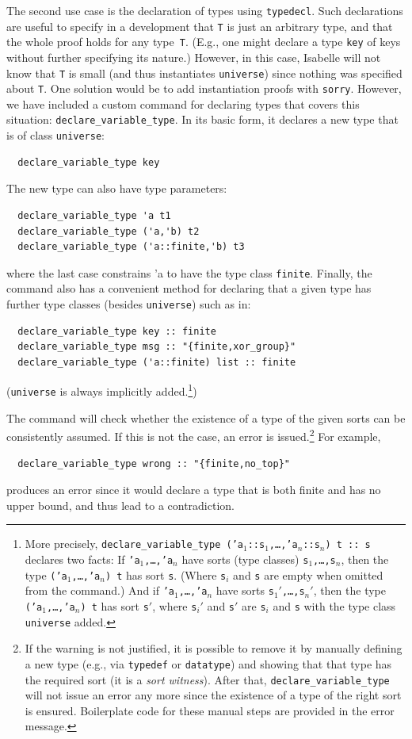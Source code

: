 \documentclass{article}
\begin{document}
The second use case is the declaration of types using
\texttt{typedecl}. Such declarations are useful to specify in a
development that \texttt{T} is just an arbitrary type, and that the
whole proof holds for any type~\texttt{T}. (E.g., one might declare a
type \texttt{key} of keys without further specifying its nature.)
However, in this case, Isabelle will not know that \texttt{T} is
small (and thus instantiates \texttt{universe}) since
nothing was specified about \texttt{T}. One solution would be to add
instantiation proofs with \texttt{sorry}. However, we have included a
custom command for declaring types that covers this situation:
\texttt{declare\_variable\_type}. In its basic form, it declares a new
type that is of class \texttt{universe}:
\begin{lstlisting}
  declare_variable_type key
\end{lstlisting}
The new type can also have type parameters:
\begin{lstlisting}
  declare_variable_type 'a t1
  declare_variable_type ('a,'b) t2
  declare_variable_type ('a::finite,'b) t3
\end{lstlisting}
where the last case constrains 'a to have the type class
\texttt{finite}.  Finally, the command also has a convenient method
for declaring that a given type has further type classes (besides \texttt{universe}) such as in:
\begin{lstlisting}
  declare_variable_type key :: finite
  declare_variable_type msg :: "{finite,xor_group}"
  declare_variable_type ('a::finite) list :: finite
\end{lstlisting}
(\texttt{universe} is always implicitly added.\footnote{More precisely,
  \texttt{declare\_variable\_type\ ('a$_1$::s$_1$,\dots,'a$_n$::s$_n$) t :: s}
  declares two facts: If \texttt{'a$_1$,\dots,'a$_n$} have sorts (type classes)
  \texttt{s$_1$,\dots,s$_n$}, then the type \texttt{('a$_1$,\dots,'a$_n$) t}
  has sort \texttt{s}. (Where \texttt{s$_i$} and \texttt{s} are empty when omitted from the command.)
  And
  if \texttt{'a$_1$,\dots,'a$_n$} have sorts
  \texttt{s$_1'$,\dots,s$_n'$}, then the type \texttt{('a$_1$,\dots,'a$_n$) t}
  has sort \texttt{s$'$}, where \texttt{s$_i'$} and \texttt{s$'$} are
  \texttt{s$_i$} and \texttt{s} with the type class \texttt{universe} added.})

The command will check whether the existence of a type of the given
sorts can be consistently assumed.  If this is not the case, an error
is issued.\footnote{If the warning is not justified, it is possible to
  remove it by manually defining a new type (e.g., via
  \texttt{typedef} or \texttt{datatype}) and showing that that type
  has the required sort (it is a \emph{sort witness}). After that,
  \texttt{declare\_variable\_type} will not issue an error any more
  since the existence of a type of the right sort is ensured.
  Boilerplate code for these manual steps are provided in the error message.}
For example,
\begin{lstlisting}
  declare_variable_type wrong :: "{finite,no_top}"
\end{lstlisting}
produces an error since it would declare a type that is both finite
and has no upper bound, and thus lead to a contradiction.
\end{document}
